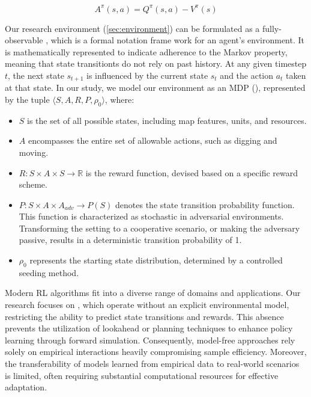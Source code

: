 \begin{equation}
    A^{\pi}(s, a) = Q^{\pi}(s, a) - V^{\pi}(s)
    \label{eq:advantage}
\end{equation}

\noindent Our research environment (\autoref{sec:environment}) can be formulated as a fully-observable , which is a formal notation frame work for an agent's environment. It is mathematically represented to indicate adherence to the Markov property, meaning that state transitionts do not rely on past history. At any given timestep $t$, the next state $s_{t+1}$ is influenced by the current state $s_t$ and the action $a_t$ taken at that state. In our study, we model our environment as an MDP (\textcolor{deepblue}{\cite{SpinningUp2018}}), represented by the tuple $\langle S, A, R, P, \rho_0 \rangle$, where:

\vspace{-5pt}

\begin{itemize}[itemsep=1pt, parsep=0pt]
    \item $S$ is the set of all possible states, including map features, units, and resources.
    \item $A$ encompasses the entire set of allowable actions, such as digging and moving.
    \item $R : S \times A \times S \rightarrow \mathbb{R}$ is the reward function, devised based on a specific reward scheme.
    \item $P : S \times A \times A_{adv} \rightarrow P(S)$ denotes the state transition probability function. This function is characterized as stochastic in adversarial environments. Transforming the setting to a cooperative scenario, or making the adversary passive, results in a deterministic transition probability of 1.
    \item $\rho_0$ represents the starting state distribution, determined by a controlled seeding method.
\end{itemize}

\noindent Modern RL algorithms fit into a diverse range of domains and applications. Our research focuses on , which operate without an explicit environmental model, restricting the ability to predict state transitions and rewards. This absence prevents the utilization of lookahead or planning techniques to enhance policy learning through forward simulation. Consequently, model-free approaches rely solely on empirical interactions heavily compromising sample efficiency. Moreover, the transferability of models learned from empirical data to real-world scenarios is limited, often requiring substantial computational resources for effective adaptation. 

